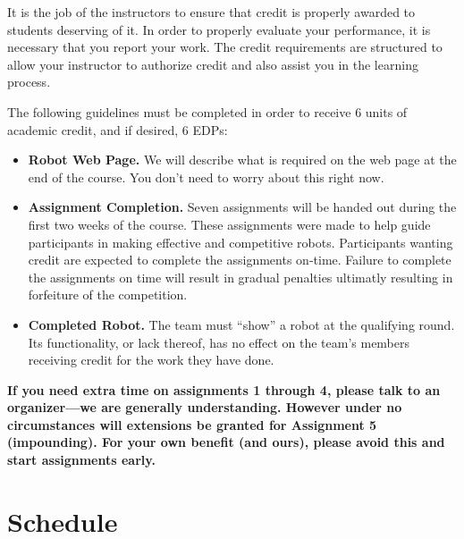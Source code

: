 It is the job of the instructors to ensure that credit is properly awarded to
students deserving of it. In order to properly evaluate your performance, it is
necessary that you report your work. The credit requirements are structured to
allow your instructor to authorize credit and also assist you in the learning
process.

The following guidelines must be completed in order to receive 6 units of
academic credit, and if desired, 6 EDPs:

\begin{itemize}

\item {\bf Robot Web Page.}
We will describe what is required on the web page at the end of the course. You
don't need to worry about this right now.

\item {\bf Assignment Completion.}
Seven assignments will be handed out during the first two weeks of the course.
These assignments were made to help guide participants in making effective and
competitive robots. Participants wanting credit are expected to complete the
assignments on-time. Failure to complete the assignments on time will result in
gradual penalties ultimatly resulting in forfeiture of the competition.

\item {\bf Completed Robot.}
The team must ``show'' a robot at the qualifying round. Its functionality, or
lack thereof, has no effect on the team's members receiving credit for the work
they have done.
\end{itemize}


{\bf If you need extra time on
assignments 1 through 4, please talk to an organizer---we are generally
understanding. However under no circumstances will extensions be granted for
Assignment 5 (impounding). For your own benefit (and ours), please avoid this
and start assignments early.}


\section{Schedule}

